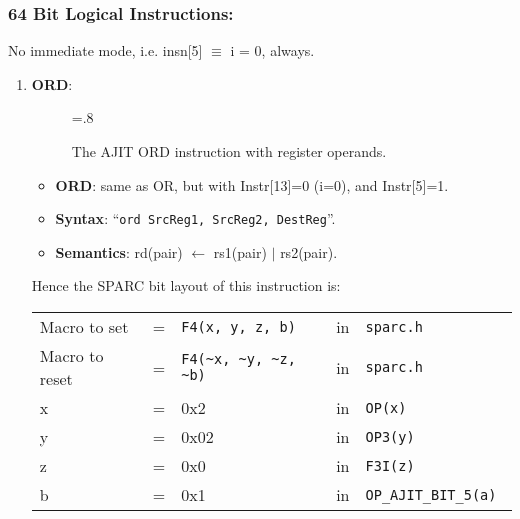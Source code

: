\subsubsection{64 Bit Logical Instructions:}
\label{sec:64:bit:logical:insn:impl}

No immediate mode, i.e. insn[5] $\equiv$ i = 0, always.

\begin{enumerate}
\item \textbf{ORD}:\\
  \begin{center}
    \begin{figure}[h]
      \centering
      \epsfxsize=.8\linewidth
      \caption{The AJIT ORD instruction  with register operands.}
      \label{fig:ajit:ord:insn}
    \end{figure}
  \end{center}
  \begin{itemize}
  \item []\textbf{ORD}: same as OR, but with Instr[13]=0 (i=0), and
    Instr[5]=1.
  \item []\textbf{Syntax}: ``\texttt{ord  SrcReg1, SrcReg2, DestReg}''.
  \item []\textbf{Semantics}: rd(pair) $\leftarrow$ rs1(pair) $\vert$ rs2(pair).
  \end{itemize}

  Hence the SPARC bit layout of this instruction is:

  \begin{tabular}[h]{lclcl}
    Macro to set   &=&  \verb|F4(x, y, z, b)|     &in& \verb|sparc.h|     \\
    Macro to reset &=&  \verb|F4(~x, ~y, ~z, ~b)| &in& \verb|sparc.h|     \\
    x              &=& 0x2                        &in& \verb|OP(x) | \\
    y              &=& 0x02                       &in& \verb|OP3(y) | \\
    z              &=& 0x0                        &in& \verb|F3I(z) | \\
    b              &=& 0x1                        &in& \verb|OP_AJIT_BIT_5(a) |
  \end{tabular}


\end{enumerate}
